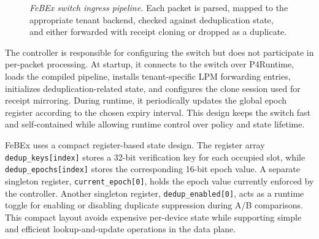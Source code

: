 \begin{figure}[t]
\centering
{}
\caption{\emph{FeBEx switch ingress pipeline.} Each packet is parsed, mapped to the appropriate tenant backend, checked against deduplication state, and either forwarded with receipt cloning or dropped as a duplicate.}
\label{fig:impl-switch-flow}
\end{figure}
The controller is responsible for configuring the switch but does not participate in per-packet processing. At startup, it connects to the switch over P4Runtime, loads the compiled pipeline, installs tenant-specific LPM forwarding entries, initializes deduplication-related state, and configures the clone session used for receipt mirroring. During runtime, it periodically updates the global epoch register according to the chosen expiry interval. This design keeps the switch fast and self-contained while allowing runtime control over policy and state lifetime.

FeBEx uses a compact register-based state design. The register array \texttt{dedup\_keys[index]} stores a 32-bit verification key for each occupied slot, while \texttt{dedup\_epochs[index]} stores the corresponding 16-bit epoch value. A separate singleton register, \texttt{current\_epoch[0]}, holds the epoch value currently enforced by the controller. Another singleton register, \texttt{dedup\_enabled[0]}, acts as a runtime toggle for enabling or disabling duplicate suppression during A/B comparisons. This compact layout avoids expensive per-device state while supporting simple and efficient lookup-and-update operations in the data plane.

